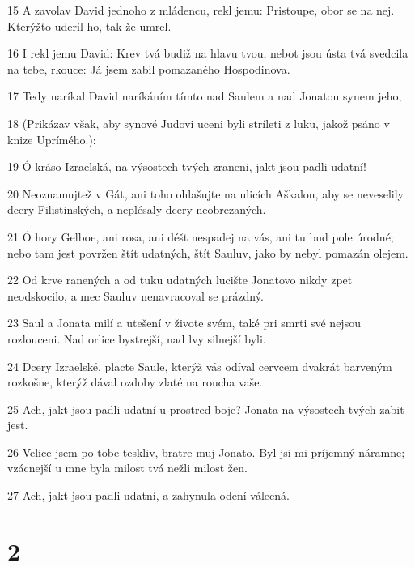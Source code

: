 \par 15 A zavolav David jednoho z mládencu, rekl jemu: Pristoupe, obor se na nej. Kterýžto uderil ho, tak že umrel.
\par 16 I rekl jemu David: Krev tvá budiž na hlavu tvou, nebot jsou ústa tvá svedcila na tebe, rkouce: Já jsem zabil pomazaného Hospodinova.
\par 17 Tedy naríkal David naríkáním tímto nad Saulem a nad Jonatou synem jeho,
\par 18 (Prikázav však, aby synové Judovi uceni byli stríleti z luku, jakož psáno v knize Uprímého.):
\par 19 Ó kráso Izraelská, na výsostech tvých zraneni, jakt jsou padli udatní!
\par 20 Neoznamujtež v Gát, ani toho ohlašujte na ulicích Aškalon, aby se neveselily dcery Filistinských, a neplésaly dcery neobrezaných.
\par 21 Ó hory Gelboe, ani rosa, ani déšt nespadej na vás, ani tu bud pole úrodné; nebo tam jest povržen štít udatných, štít Sauluv, jako by nebyl pomazán olejem.
\par 22 Od krve ranených a od tuku udatných lucište Jonatovo nikdy zpet neodskocilo, a mec Sauluv nenavracoval se prázdný.
\par 23 Saul a Jonata milí a utešení v živote svém, také pri smrti své nejsou rozlouceni. Nad orlice bystrejší, nad lvy silnejší byli.
\par 24 Dcery Izraelské, placte Saule, kterýž vás odíval cervcem dvakrát barveným rozkošne, kterýž dával ozdoby zlaté na roucha vaše.
\par 25 Ach, jakt jsou padli udatní u prostred boje? Jonata na výsostech tvých zabit jest.
\par 26 Velice jsem po tobe teskliv, bratre muj Jonato. Byl jsi mi príjemný náramne; vzácnejší u mne byla milost tvá nežli milost žen.
\par 27 Ach, jakt jsou padli udatní, a zahynula odení válecná.

\chapter{2}


